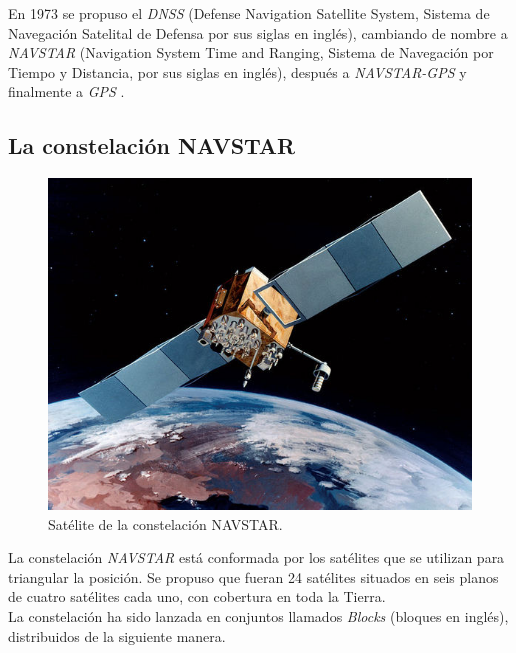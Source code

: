 En 1973 se propuso el \textit{DNSS} (Defense Navigation Satellite System, Sistema de Navegación Satelital de Defensa por sus siglas en inglés), cambiando de nombre a \textit{NAVSTAR} (Navigation System Time and Ranging, Sistema de Navegación por Tiempo y Distancia, por sus siglas en inglés), después a \textit{NAVSTAR-GPS} y finalmente a \textit{GPS} \cite{termal2014prototipo}.

\subsection{La constelación NAVSTAR}

\begin{figure}[ht]
\centering
\includegraphics[scale=0.29]{Figures/Navstar}
\caption[Satélite de la constelación NAVSTAR.]{Satélite de la constelación NAVSTAR\footnotemark.}
\label{fig:NAV}
\end{figure}


La constelación \textit{NAVSTAR} está conformada por los satélites que se utilizan para triangular la posición. Se propuso que fueran 24 satélites situados en seis planos de cuatro satélites cada uno, con cobertura en toda la Tierra. \\

La constelación ha sido lanzada en conjuntos llamados \textit{Blocks} (bloques en inglés), distribuidos de la siguiente manera.

